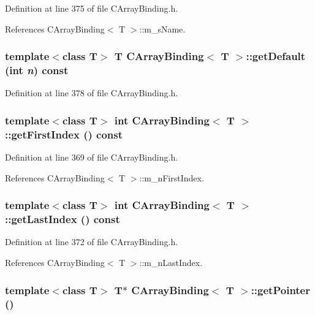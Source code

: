 Definition at line 375 of file CArray\-Binding.h.

References CArray\-Binding$<$ T $>$::m\_\-s\-Name.
\subsubsection{\setlength{\rightskip}{0pt plus 5cm}template$<$class T$>$ T CArray\-Binding$<$ T $>$::get\-Default (int {\em n}) const\hspace{0.3cm}{\tt  [inline]}}\label{classCArrayBinding_a8}




Definition at line 378 of file CArray\-Binding.h.
\subsubsection{\setlength{\rightskip}{0pt plus 5cm}template$<$class T$>$ int CArray\-Binding$<$ T $>$::get\-First\-Index () const\hspace{0.3cm}{\tt  [inline]}}\label{classCArrayBinding_a5}




Definition at line 369 of file CArray\-Binding.h.

References CArray\-Binding$<$ T $>$::m\_\-n\-First\-Index.
\subsubsection{\setlength{\rightskip}{0pt plus 5cm}template$<$class T$>$ int CArray\-Binding$<$ T $>$::get\-Last\-Index () const\hspace{0.3cm}{\tt  [inline]}}\label{classCArrayBinding_a6}




Definition at line 372 of file CArray\-Binding.h.

References CArray\-Binding$<$ T $>$::m\_\-n\-Last\-Index.
\subsubsection{\setlength{\rightskip}{0pt plus 5cm}template$<$class T$>$ T$\ast$ CArray\-Binding$<$ T $>$::get\-Pointer ()\hspace{0.3cm}{\tt  [inline]}}\label{classCArrayBinding_a4}




